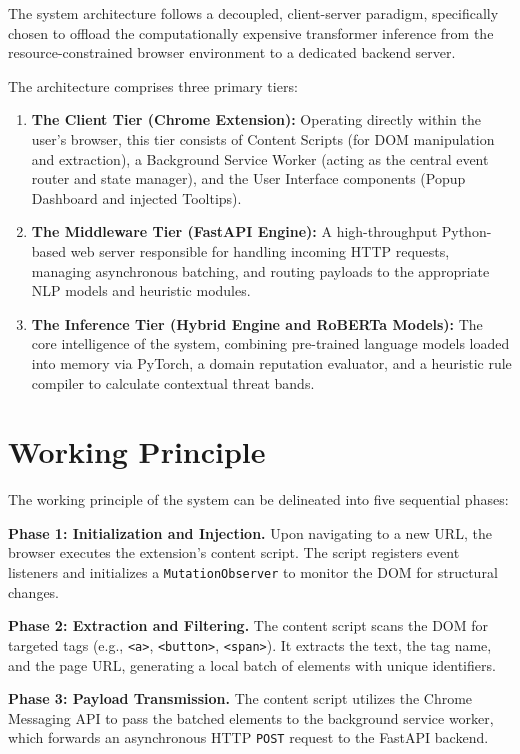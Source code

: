 The system architecture follows a decoupled, client-server paradigm, specifically chosen to offload the computationally expensive transformer inference from the resource-constrained browser environment to a dedicated backend server.

The architecture comprises three primary tiers:

\begin{enumerate}
    \item \textbf{The Client Tier (Chrome Extension):} Operating directly within the user's browser, this tier consists of Content Scripts (for DOM manipulation and extraction), a Background Service Worker (acting as the central event router and state manager), and the User Interface components (Popup Dashboard and injected Tooltips).
    \item \textbf{The Middleware Tier (FastAPI Engine):} A high-throughput Python-based web server responsible for handling incoming HTTP requests, managing asynchronous batching, and routing payloads to the appropriate NLP models and heuristic modules.
    \item \textbf{The Inference Tier (Hybrid Engine and RoBERTa Models):} The core intelligence of the system, combining pre-trained language models loaded into memory via PyTorch, a domain reputation evaluator, and a heuristic rule compiler to calculate contextual threat bands.
\end{enumerate}

\section{Working Principle}

The working principle of the system can be delineated into five sequential phases:

\textbf{Phase 1: Initialization and Injection.} Upon navigating to a new URL, the browser executes the extension's content script. The script registers event listeners and initializes a \texttt{MutationObserver} to monitor the DOM for structural changes.

\textbf{Phase 2: Extraction and Filtering.} The content script scans the DOM for targeted tags (e.g., \texttt{<a>}, \texttt{<button>}, \texttt{<span>}). It extracts the text, the tag name, and the page URL, generating a local batch of elements with unique identifiers.

\textbf{Phase 3: Payload Transmission.} The content script utilizes the Chrome Messaging API to pass the batched elements to the background service worker, which forwards an asynchronous HTTP \texttt{POST} request to the FastAPI backend.

